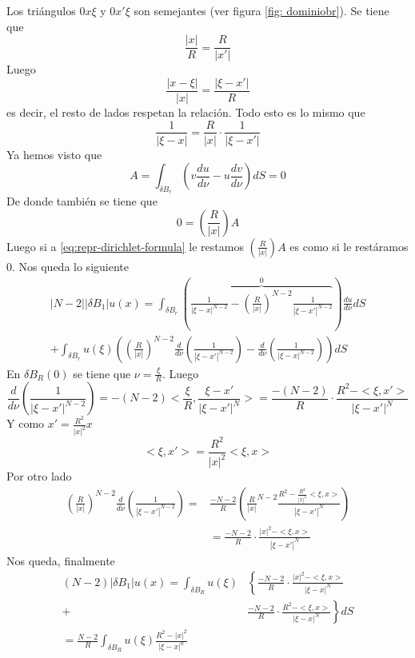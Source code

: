 Los triángulos $0x\xi$ y $0x'\xi$ son semejantes (ver figura \ref{fig: dominiobr}). Se tiene que
$$\frac{|x|}{R} = \frac{R}{|x'|}$$ Luego $$\frac{|x-\xi|}{|x|} = \frac{|\xi-x'|}{R}$$ es decir, el resto de lados respetan la relación. Todo esto es lo mismo que
$$\frac{1}{|\xi-x|} = \frac{R}{|x|}\cdot\frac{1}{|\xi-x'|}$$
Ya hemos visto que
$$A = \int_{\delta B_r} \left(v\frac{du}{d\nu}-u\frac{dv}{d\nu}\right)dS = 0$$
De donde también se tiene que
$$0 = \left(\frac{R}{|x|}\right)A$$
Luego si a \eqref{eq:repr-dirichlet-formula} le restamos $\left(\frac{R}{|x|}\right)A$ es como si le restáramos $0$.
Nos queda lo siguiente
\begin{align*}
|N-2||\delta B_1|u(x) = \int_{\delta B_r}\left(\overbrace{\frac{1}{|\xi-x|^{N-2}}-\left(\frac{R}{|x|}\right)^{N-2}\frac{1}{|\xi-x'|^{N-2}}}^0\right)\frac{du}{d\nu}dS\\
+ \int_{\delta B_r}u(\xi)\left(\left(\frac{R}{|x|}\right)^{N-2}\frac{d}{d\nu}\left(\frac{1}{|\xi-x'|^{N-2}}\right)-\frac{d}{d\nu}\left(\frac{1}{|\xi-x|^{N-2}}\right)\right)dS
\end{align*}
En $\delta B_R(0)$ se tiene que $\nu=\frac{\xi}{R}$. Luego
$$\frac{d}{d\nu}\left (\frac{1}{|\xi-x'|^{N-2}}\right)=-(N-2)<\frac{\xi}{R}, \frac{\xi-x'}{|\xi-x'|^N}> = \frac{-(N-2)}{R}\cdot\frac{R^2-<\xi,x'>}{|\xi-x'|^N}$$
Y como $x' = \frac{R^2}{|x|^2}x$
$$<\xi,x'> = \frac{R^2}{|x|^2}<\xi, x>$$
Por otro lado
\begin{align*}
\left(\frac{R}{|x|}\right)^{N-2}\frac{d}{d\nu}\left(\frac{1}{|\xi-x'|^{N-2}}\right) =& \frac{-N-2}{R}\left(\frac{R}{|x|}^{N-2}\frac{R^2-\frac{R^2}{|x|^2}<\xi,x>}{|\xi-x'|^N}\right)\\
& = \frac{-N-2}{R}\cdot\frac{|x|^2-<\xi,x>}{|\xi-x'|^N}
\end{align*}
Nos queda, finalmente
\begin{align*}
(N-2)|\delta B_1|u(x) =  \int_{\delta B_R}u(\xi)&\left\{\frac{-N-2}{R}\cdot\frac{|x|^2-<\xi,x>}{|\xi-x|^N}\right. \\
+ & \left.\frac{-N-2}{R}\cdot\frac{R^2-<\xi,x>}{|\xi-x|^N}\right\}dS\\
= \frac{N-2}{R}\int_{\delta B_R}u(\xi)\frac{R^2-|x|^2}{|\xi-x|^n}
\end{align*}
